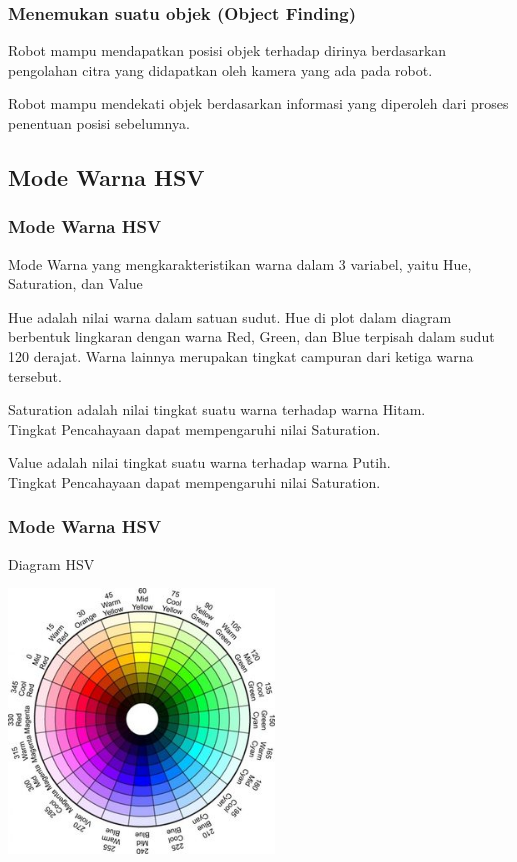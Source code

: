 \documentclass[table,dvipsnames]{beamer}
\begin{document}
\begin{frame}
\frametitle{Menemukan suatu objek (Object Finding)}
\begin{block}{}
Robot mampu mendapatkan posisi objek terhadap dirinya berdasarkan pengolahan citra yang didapatkan oleh kamera yang ada pada robot.
\end{block}
\begin{block}{}
Robot mampu mendekati objek berdasarkan informasi yang diperoleh dari proses penentuan posisi sebelumnya.
\end{block}
\end{frame}

\subsection{Mode Warna HSV}

\begin{frame}
\frametitle{Mode Warna HSV}
\begin{block}{}
Mode Warna yang mengkarakteristikan warna dalam 3 variabel, yaitu Hue, Saturation, dan Value
\end{block}
\begin{block}{}
Hue adalah nilai warna dalam satuan sudut.
Hue di plot dalam diagram berbentuk lingkaran dengan warna Red, Green, dan Blue terpisah dalam sudut 120 derajat.
Warna lainnya merupakan tingkat campuran dari ketiga warna tersebut.
\end{block}
\begin{block}{}
Saturation adalah nilai tingkat suatu warna terhadap warna Hitam.\\
Tingkat Pencahayaan dapat mempengaruhi nilai Saturation.
\end{block}
\begin{block}{}
Value adalah nilai tingkat suatu warna terhadap warna Putih.\\
Tingkat Pencahayaan dapat mempengaruhi nilai Saturation.
\end{block}
\end{frame}

\begin{frame}
\frametitle{Mode Warna HSV}
\begin{block}{Diagram HSV}
\begin{center}
 \includegraphics[width=200pt]{./tinjauan_teori/hsv/HSV}
\end{center}
\end{block}
\end{frame}
\end{document}
